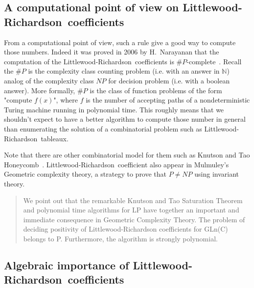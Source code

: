 \documentclass[12pt,a4paper]{article}
\newcommand{\LR}{Littlewood-Richardson\ }
\newcommand{\N}{{\mathbb N}}
\begin{document}
\subsection{A computational point of view on \LR coefficients}

From a computational point of view, such a rule give a good way to compute
those numbers. Indeed it was proved in 2006 by H.~Narayanan that the
computation of the \LR coefficients is
$\#P$-complete~\cite{Narayanan06}. Recall the $\#P$ is the complexity class
counting problem (i.e. with an answer in $\N$) analog of the complexity class
$NP$ for decision problem (i.e. with a boolean answer). More formally, $\#P$
is the class of function problems of the form "compute $f(x)$", where $f$ is
the number of accepting paths of a nondeterministic Turing machine running in
polynomial time. This roughly means that we shouldn't expect to have a better
algorithm to compute those number in general than enumerating the solution of
a combinatorial problem such as \LR tableaux. 

Note that there are other combinatorial model for them such as Knutson and Tao
Honeycomb~\cite{KnutsonTao}. \LR coefficient also appear in Mulmuley's
Geometric complexity theory, a strategy to prove that $P\neq NP$ using
invariant theory.

\begin{quotation}
  We point out that the remarkable Knutson and Tao Saturation Theorem and
  polynomial time algorithms for LP have together an important and immediate
  consequence in Geometric Complexity Theory. The problem of deciding
  positivity of Littlewood-Richardson coefficients for GLn(C) belongs to
  P. Furthermore, the algorithm is strongly polynomial.
\end{quotation}

\subsection{Algebraic importance of \LR coefficients}
\end{document}
